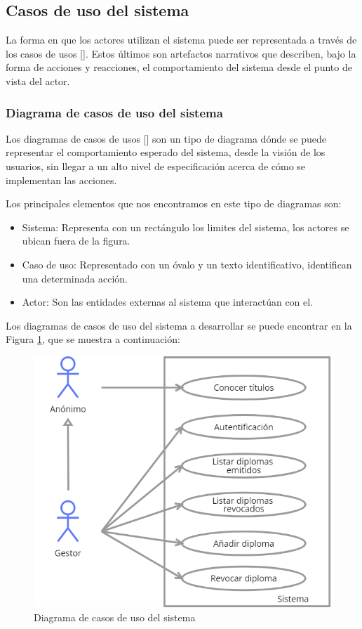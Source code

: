 \subsection{Casos de uso del sistema}
La forma en que los actores utilizan el sistema puede ser representada a través de los casos de usos [\cite{91}]. Estos últimos son artefactos narrativos que describen, bajo la forma de acciones y reacciones, el comportamiento del sistema desde el punto de vista del actor.


\subsubsection{Diagrama de casos de uso del sistema}
Los diagramas de casos de usos [\cite{91}] son un tipo de diagrama dónde se puede representar el comportamiento esperado del sistema, desde la visión de los usuarios, sin llegar a un alto nivel de especificación acerca de cómo se implementan las acciones.

Los principales elementos que nos encontramos en este tipo de diagramas son:
\begin{itemize}
\item Sistema: Representa con un rectángulo los limites del sistema, los actores se ubican fuera de la figura.
\item Caso de uso: Representado con un óvalo y un texto identificativo, identifican una determinada acción.
\item Actor: Son las entidades externas al sistema que interactúan con el.
\end{itemize}

Los diagramas de casos de uso del sistema a desarrollar se puede encontrar en la Figura \ref{fig:useCases}, que se muestra a continuación:

\begin{figure}[htp]
\centering
\includegraphics[scale=0.6]{Graphics/useCasest}
\caption{Diagrama de casos de uso del sistema}
\label{fig:useCases}
\end{figure}

